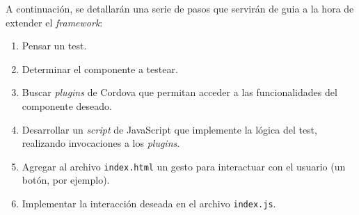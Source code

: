 A continuación, se detallarán una serie de pasos que servirán de guia a la hora de extender el \emph{framework}:
\begin{enumerate}
\item Pensar un test.
\item Determinar el componente a testear.
\item Buscar \emph{plugins} de Cordova que permitan acceder a las funcionalidades del componente deseado.
\item Desarrollar un \emph{script} de JavaScript que implemente la lógica del test, realizando invocaciones a los \emph{plugins}.
\item Agregar al archivo \texttt{index.html} un gesto para interactuar con el usuario (un botón, por ejemplo).
\item Implementar la interacción deseada en el archivo \texttt{index.js}.
\end{enumerate}